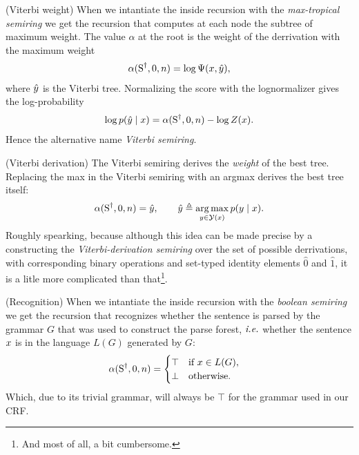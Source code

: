 \begin{example}{(Viterbi weight)}
  \label{ex:vit-weight}
  When we intantiate the inside recursion with the \textit{max-tropical semiring} we get the recursion that computes at each node the subtree of maximum weight. The value $\alpha$ at the root is the weight of the derrivation with the maximum weight
  \begin{align*}
    \alpha(\text{S}^{\dagger}, 0, n) = \log \Psi(x, \hat{y}),
  \end{align*}
  where $\hat{y}$ is the Viterbi tree. Normalizing the score with the lognormalizer gives the log-probability
  \begin{align*}
    \log p(\hat{y} \mid x) = \alpha(\text{S}^{\dagger}, 0, n) - \log Z(x).
  \end{align*}
  Hence the alternative name \textit{Viterbi semiring}.
\end{example}

\begin{example}{(Viterbi derivation)}
  \label{ex:vit-derivation}
  The Viterbi semiring derives the \textit{weight} of the best tree. Replacing the max in the Viterbi semiring with an argmax derives the best tree itself:
  \begin{align*}
    \alpha(\text{S}^{\dagger}, 0, n) = \hat{y}, \qquad \hat{y} \triangleq \operatorname*{arg\,max}_{y \in \mathcal{Y}(x)} p(y \mid x).
  \end{align*}
  Roughly spearking, because although this idea can be made precise by a constructing the \textit{Viterbi-derivation semiring} \citep{goodman1999semiring} over the set of possible derrivations, with corresponding binary operations and set-typed identity elements $\hat{0}$ and $\hat{1}$, it is a litle more complicated than that\footnote{And most of all, a bit cumbersome.}.
\end{example}

\begin{example}{(Recognition)}
  When we intantiate the inside recursion with the \textit{boolean semiring} we get the recursion that recognizes whether the sentence is parsed by the grammar $G$ that was used to construct the parse forest, $\emph{i.e.}$ whether the sentence $x$ is in the language $L(G)$ generated by $G$:
  \begin{align*}
    \alpha(\text{S}^{\dagger}, 0, n) &= \begin{cases}
      \top & \mbox{if } x \in L(G),  \\
      \bot & \mbox{otherwise.}
  \end{cases}
  \end{align*}
  Which, due to its trivial grammar, will always be $\top$ for the grammar used in our CRF.
\end{example}

